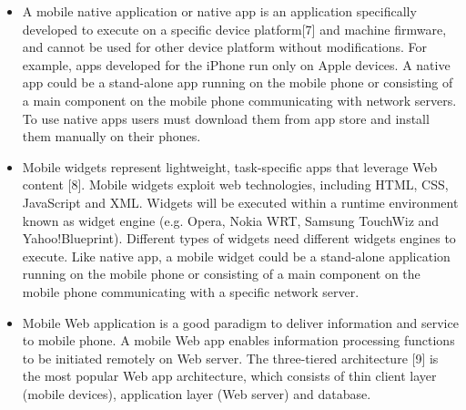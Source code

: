 \begin{itemize}
        \item
        A mobile native application or native app is an application specifically developed to execute on a specific device platform[7] and machine firmware, and cannot be used for other device platform without modifications. For example, apps developed for the iPhone run only on Apple devices. A native app could be a stand-alone app running on the mobile phone or consisting of a main component on the mobile phone communicating with network servers. To use native apps users must download them from app store and install them manually on their phones.\cite{Mobile_App_Paradigms}
        \item
        Mobile widgets represent lightweight, task-specific apps that leverage Web content [8]. Mobile widgets exploit web technologies, including HTML, CSS, JavaScript and XML. Widgets will be executed within a runtime environment known as widget engine (e.g. Opera, Nokia WRT, Samsung TouchWiz and Yahoo!Blueprint). Different types of widgets need different widgets engines to execute. Like native app, a mobile widget could be a stand-alone application running on the mobile phone or consisting of a main component on the mobile phone communicating with a specific network server.\cite{Mobile_App_Paradigms}
        \item
        Mobile Web application is a good paradigm to deliver information and service to mobile phone. A mobile Web app enables information processing functions to be initiated remotely on Web server. The three-tiered architecture [9] is the most popular Web app architecture, which consists of thin client layer (mobile devices), application layer (Web server) and database. \cite{Mobile_App_Paradigms}
        

\end{itemize}
